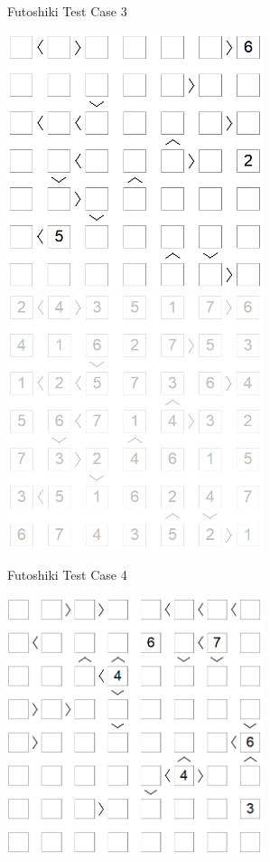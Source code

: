 ﻿\documentclass[a4paper, 11pt]{article}
\begin{document}
\begin{enumerate}
\begin{figure}[htbp]
    \caption{Futoshiki Test Case 3}
    \label{fig:case33}
  \end{figure}
        \begin{figure}[htbp]
    \centering
    \includegraphics[width=7.5cm]{Pic/f4}
    \qquad
    \includegraphics[width=7.5cm]{Pic/f4s}
    \caption{Futoshiki Test Case 4}
    \label{fig:case44}
  \end{figure}
        \begin{figure}[htbp]
    \centering
    \includegraphics[width=7.5cm]{Pic/f5}

\end{figure}
\end{enumerate}
\end{document}
